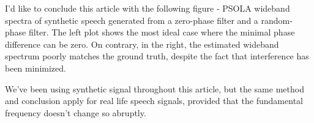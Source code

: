 \documentclass{article}
\begin{document}
I'd like to conclude this article with the following figure - PSOLA wideband spectra of synthetic speech generated from a zero-phase filter and a random-phase filter. The left plot shows the most ideal case where the minimal phase difference can be zero. On contrary, in the right, the estimated wideband spectrum poorly matches the ground truth, despite the fact that interference has been minimized.

\begin{figure}[H]
\centering
\scalebox{.6}{}
\scalebox{.6}{}
\caption{}
\label{fig:psola-wb-phase}
\end{figure}

We've been using synthetic signal throughout this article, but the same method and conclusion apply for real life speech signals, provided that the fundamental frequency doesn't change so abruptly.

\begin{thebibliography}{99}




\end{thebibliography}
\end{document}
